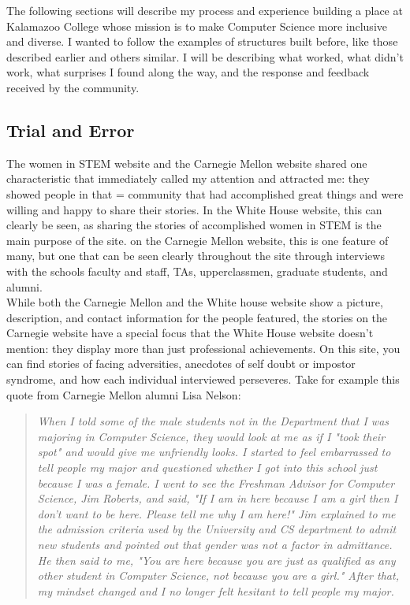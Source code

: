 \documentclass[12pt]{article}
\begin{document}
	The following sections will describe my process and experience building a place at Kalamazoo College whose mission is to make Computer Science more inclusive and diverse. I wanted to follow the examples of structures built before, like those described earlier and others similar. I will be describing what worked, what didn't work, what surprises I found along the way, and the response and feedback received by the community.\\
	\pagebreak
	
	
	
	\subsection{Trial and Error}
    The women in STEM website and the Carnegie Mellon website shared one characteristic that immediately called my attention and attracted me: they showed people in that = community that had accomplished great things and were willing and happy to share their stories. In the White House website, this can clearly be seen, as sharing the stories of accomplished women in STEM is the main purpose of the site. on the Carnegie Mellon website, this is one feature of many, but one that can be seen clearly throughout the site through interviews with the schools faculty and staff, TAs, upperclassmen, graduate students, and alumni. \\
    
    While both the Carnegie Mellon and the White house website show a picture, description, and contact information for the people featured, the stories on the Carnegie website have a special focus that the White House website doesn't mention: they display more than just professional achievements. On this site, you can find stories of facing adversities, anecdotes of self doubt or impostor syndrome, and how each individual interviewed perseveres. Take for example this quote from Carnegie Mellon alumni Lisa Nelson: 
    
    \begin{quotation}
    	\begin{center}
    		\singlespacing
    		\textit{When I told some of the male students not in the Department that I was majoring in Computer Science, they would look at me as if I "took their spot" and would give me unfriendly looks. I started to feel embarrassed to tell people my major and questioned whether I got into this school just because I was a female. I went to see the Freshman Advisor for Computer Science, Jim Roberts, and said, "If I am in here because I am a girl then I don't want to be here. Please tell me why I am here!" Jim explained to me the admission criteria used by the University and CS department to admit new students and pointed out that gender was not a factor in admittance. He then said to me, "You are here because you are just as qualified as any other student in Computer Science, not because you are a girl." After that, my mindset changed and I no longer felt hesitant to tell people my major. }
    	\end{center}
    \end{quotation}
    
\end{document}
